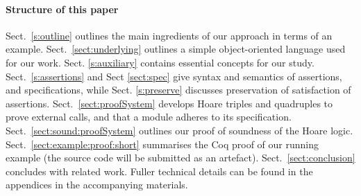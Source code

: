  \paragraph{Structure of this paper}
Sect.\ \ref{s:outline}   outlines the main ingredients of our approach in terms of an {example}.
Sect.\ \ref{sect:underlying} outlines a simple object-oriented language used for our work. 
 Sect. \ref{s:auxiliary}  {contains essential concepts for our study}.
Sect.\ \ref{s:assertions} and 
 Sect \ref{sect:spec}  give syntax and semantics of assertions, and  specifications,
{while Sect. \ref{s:preserve} discusses preservation of satisfaction of assertions.}
Sect.\ \ref{sect:proofSystem} develops Hoare triples and quadruples to prove external calls, and that a module adheres to its %
 specification.
Sect.\ \ref{sect:sound:proofSystem} outlines {our} proof of soundness of
the Hoare logic. 
Sect.\ \ref{sect:example:proof:short} summarises  the Coq proof
  of  our running example (the source code will be submitted as an artefact). 
 Sect.\ \ref{sect:conclusion} concludes with related work. 
Fuller technical details can be found in the appendices in the accompanying materials. 
